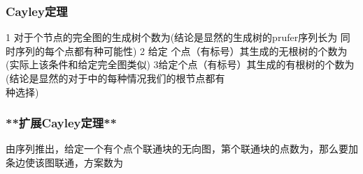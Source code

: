 \documentclass[8pt,a4paper]{article}
\newcommand{\txt}[1]{\par\noindent\footnotesize #1}
\newcommand{\inlineformula}[1]{\ensuremath{}}
\newcommand{\displayformula}[1]{%
    \vspace{0.2em}
    \[
        
    \]
}
\begin{document}
\begin{multicols}{2}
        \subsubsection{Cayley定理}
            \txt{1 对于\inlineformula{./assets/formulas_tex/formula_353.tex}个节点的完全图的生成树个数为\inlineformula{./assets/formulas_tex/formula_354.tex}(结论是显然的生成树的prufer序列长为\inlineformula{./assets/formulas_tex/formula_355.tex} 同时\inlineformula{./assets/formulas_tex/formula_356.tex}序列的每个点都有\inlineformula{./assets/formulas_tex/formula_357.tex}种可能性)
2 给定 \inlineformula{./assets/formulas_tex/formula_358.tex}个点（有标号）其生成的无根树的个数为\inlineformula{./assets/formulas_tex/formula_359.tex}(实际上该条件和给定完全图类似)
3给定\inlineformula{./assets/formulas_tex/formula_360.tex}个点（有标号）其生成的有根树的个数为\inlineformula{./assets/formulas_tex/formula_361.tex}(结论是显然的对于\inlineformula{./assets/formulas_tex/formula_362.tex}中的每种情况我们的根节点都有\displayformula{./assets/formulas_tex/formula_363.tex}种选择)}
        \subsubsection{**扩展Cayley定理**}
            \txt{由\inlineformula{./assets/formulas_tex/formula_364.tex}序列推出，给定一个有\inlineformula{./assets/formulas_tex/formula_365.tex}个点\inlineformula{./assets/formulas_tex/formula_366.tex}个联通块的无向图，第\inlineformula{./assets/formulas_tex/formula_367.tex}个联通块的点数为\inlineformula{./assets/formulas_tex/formula_368.tex}，那么要加\inlineformula{./assets/formulas_tex/formula_369.tex}条边使该图联通，方案数为\inlineformula{./assets/formulas_tex/formula_370.tex}}

\end{multicols}
\end{document}
